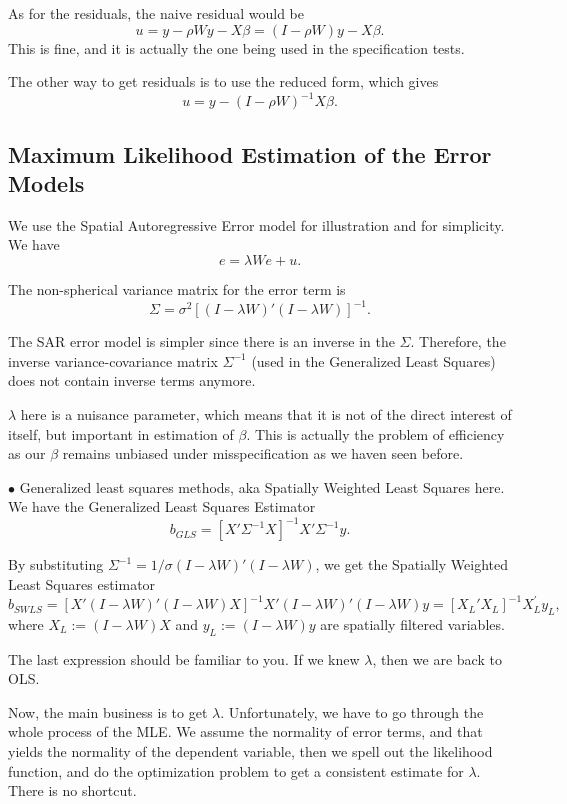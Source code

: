 \documentclass[11pt,a4paper]{amsart}
\theoremstyle{plain}
\theoremstyle{definition}
\begin{document}
As for the residuals, the naive residual would be 
\[	u = y - \rho W y - X \beta = (I - \rho W)y - X \beta.	\]
This is fine, and it is actually the one being used in the specification tests.

The other way to get residuals is to use the reduced form, which gives
\[	u = y - (I - \rho W)^{-1}X\beta.	\]

\subsection{Maximum Likelihood Estimation of the Error Models}

We use the Spatial Autoregressive Error model for illustration and for simplicity. We have 
\[	e = \lambda We + u.	\]

The non-spherical variance matrix for the error term is 
\[	\Sigma = \sigma^{2}[(I-\lambda W)'(I - \lambda W)]^{-1}.	\]

The SAR error model is simpler since there is an inverse in the $\Sigma$. Therefore, the inverse variance-covariance matrix $\Sigma^{-1}$ (used in the Generalized Least Squares) does not contain inverse terms anymore.

$\lambda$ here is a nuisance parameter, which means that it is not of the direct interest of itself, but important in estimation of $\beta$. This is actually the problem of efficiency as our $\beta$ remains unbiased under misspecification as we haven seen before. 

$\bullet$ Generalized least squares methods, aka Spatially Weighted Least Squares here.
We have the Generalized Least Squares Estimator
\[ b_{GLS} = [X'\Sigma^{-1}X]^{-1} X'\Sigma^{-1}y. \]

By substituting $\Sigma^{-1} = 1/\sigma (I-\lambda W)'(I - \lambda W)$, we get the Spatially Weighted Least Squares estimator
\[	b_{SWLS} = [X'  (I-\lambda W)'(I - \lambda W) X]^{-1} X'  (I-\lambda W)'(I - \lambda W) y = [X_{L}'X_{L}]^{-1}X_{L}^{'}y_{L},	\]
where $X_{L} := (I-\lambda W)X$ and $y_{L} := (I-\lambda W)y$ are spatially filtered  variables. 

The last expression should be familiar to you. If we knew $\lambda$, then we are back to OLS.

Now, the main business is to get $\lambda$. Unfortunately, we have to go through the whole process of the MLE. We assume the normality of error terms, and that yields the normality of the dependent variable, then we spell out the likelihood function, and do the optimization problem to get a consistent estimate for $\lambda$. There is no shortcut. 
\end{document}
